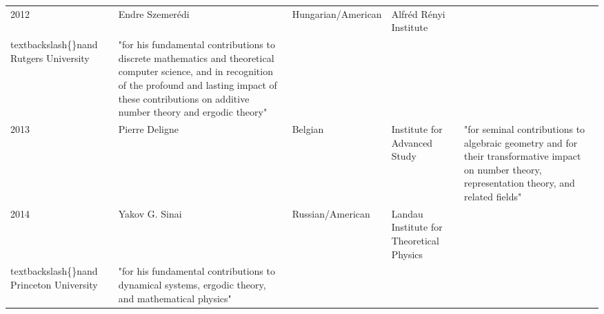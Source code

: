 \documentclass{article}
\begin{document}
\begin{tabular}{lllll}
2012 & Endre Szemerédi & Hungarian/American & Alfréd Rényi Institute\\textbackslash\{\}nand Rutgers University & "for his fundamental contributions to discrete mathematics and theoretical computer science, and in recognition of the profound and lasting impact of these contributions on additive number theory and ergodic theory" \\
2013 & Pierre Deligne & Belgian & Institute for Advanced Study & "for seminal contributions to algebraic geometry and for their transformative impact on number theory, representation theory, and related fields" \\
2014 & Yakov G. Sinai & Russian/American & Landau Institute for Theoretical Physics\\textbackslash\{\}nand Princeton University & "for his fundamental contributions to dynamical systems, ergodic theory, and mathematical physics" \\
\bottomrule
\end{tabular}
\end{document}
